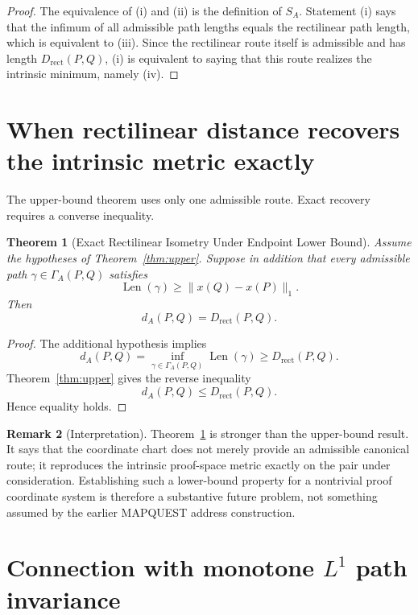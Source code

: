 \documentclass[11pt]{article}
\newtheorem{theorem}{Theorem}[section]
\theoremstyle{definition}
\newtheorem{remark}[theorem]{Remark}
\newcommand{\Drect}{D_{\mathrm{rect}}}
\newcommand{\len}{\operatorname{Len}}
\newcommand{\distA}{d_A}
\begin{document}
\begin{proof}
The equivalence of (i) and (ii) is the definition of $S_A$.  Statement (i) says that the infimum of all admissible path lengths equals the rectilinear path length, which is equivalent to (iii).  Since the rectilinear route itself is admissible and has length $\Drect(P,Q)$, (i) is equivalent to saying that this route realizes the intrinsic minimum, namely (iv).
\end{proof}

\section{When rectilinear distance recovers the intrinsic metric exactly}

The upper-bound theorem uses only one admissible route.  Exact recovery requires a converse inequality.

\begin{theorem}[Exact Rectilinear Isometry Under Endpoint Lower Bound]\label{thm:isometry}
Assume the hypotheses of Theorem~\ref{thm:upper}.  Suppose in addition that every admissible path $\gamma\in\Gamma_A(P,Q)$ satisfies
\[
\len(\gamma)
\ge
\|x(Q)-x(P)\|_1.
\]
Then
\[
\boxed{
\distA(P,Q)=\Drect(P,Q).
}
\]
\end{theorem}

\begin{proof}
The additional hypothesis implies
\[
\distA(P,Q)
=
\inf_{\gamma\in\Gamma_A(P,Q)}\len(\gamma)
\ge
\Drect(P,Q).
\]
Theorem~\ref{thm:upper} gives the reverse inequality
\[
\distA(P,Q)\le\Drect(P,Q).
\]
Hence equality holds.
\end{proof}

\begin{remark}[Interpretation]
Theorem~\ref{thm:isometry} is stronger than the upper-bound result.  It says that the coordinate chart does not merely provide an admissible canonical route; it reproduces the intrinsic proof-space metric exactly on the pair under consideration.  Establishing such a lower-bound property for a nontrivial proof coordinate system is therefore a substantive future problem, not something assumed by the earlier MAPQUEST address construction.
\end{remark}

\section{Connection with monotone $L^1$ path invariance}
\end{document}
